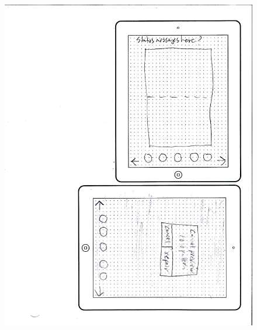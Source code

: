 \begin{figure}[htbp]
\centering
\includegraphics{figures/90_Appendix_UI_Mockups/003.png}
\caption{}
\end{figure}


